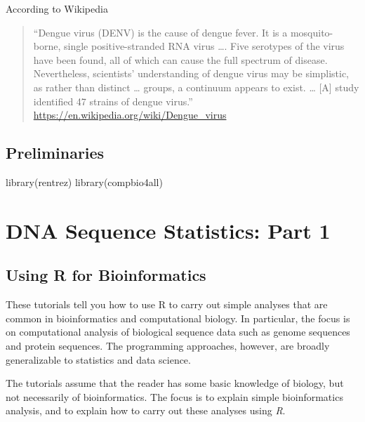 \documentclass[
]{book}
\newenvironment{Shaded}{\begin{snugshade}}{\end{snugshade}}
\newcommand{\FunctionTok}[1]{\textcolor[rgb]{0.00,0.00,0.00}{#1}}
\newcommand{\NormalTok}[1]{#1}
\begin{document}
According to Wikipedia

\begin{quote}
``Dengue virus (DENV) is the cause of dengue fever. It is a mosquito-borne, single positive-stranded RNA virus \ldots. Five serotypes of the virus have been found, all of which can cause the full spectrum of disease. Nevertheless, scientists' understanding of dengue virus may be simplistic, as rather than distinct \ldots{} groups, a continuum appears to exist. \ldots{} {[}A{]} study identified 47 strains of dengue virus.'' \url{https://en.wikipedia.org/wiki/Dengue_virus}
\end{quote}

\hypertarget{preliminaries-1}{%
\subsection{Preliminaries}\label{preliminaries-1}}

\begin{Shaded}
\begin{Highlighting}[]
\FunctionTok{library}\NormalTok{(rentrez)}
\FunctionTok{library}\NormalTok{(compbio4all)}
\end{Highlighting}
\end{Shaded}

\hypertarget{dna-sequence-statistics-part-1}{%
\section{DNA Sequence Statistics: Part 1}\label{dna-sequence-statistics-part-1}}

\hypertarget{using-r-for-bioinformatics}{%
\subsection{Using R for Bioinformatics}\label{using-r-for-bioinformatics}}

These tutorials tell you how to use R to carry out simple analyses that are common in bioinformatics and computational biology. In particular, the focus is on computational analysis of biological sequence data such as genome sequences and protein sequences. The programming approaches, however, are broadly generalizable to statistics and data science.

The tutorials assume that the reader has some basic knowledge of biology, but not necessarily of bioinformatics. The focus is to explain simple bioinformatics analysis, and to explain how to carry out these analyses using \emph{R}.
\end{document}
